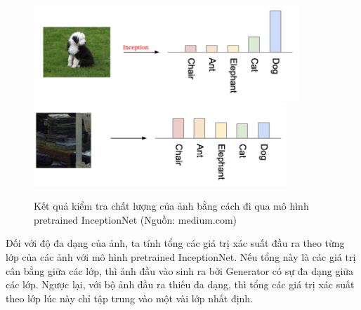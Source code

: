 {    \begin{figure}[H]
    \centering
    \includegraphics[width=10cm] {images/inception_1.png}
    \\[\smallskipamount]
    \includegraphics[width=9.5cm] {images/inception_2.png}
    \caption{Kết quả kiểm tra chất lượng của ảnh bằng cách đi qua mô hình pretrained InceptionNet (Nguồn: medium.com)}
    \label{fig:inception}
    \end{figure}
    
    \noindent Đối với độ đa dạng của ảnh, ta tính tổng các giá trị xác suất đầu ra theo từng lớp của các ảnh với mô hình pretrained InceptionNet. Nếu tổng này là các giá trị cân bằng giữa các lớp, thì ảnh đầu vào sinh ra bởi Generator có sự đa dạng giữa các lớp. Ngược lại, với bộ ảnh đầu ra thiếu đa dạng, thì tổng các giá trị xác suất theo lớp lúc này chỉ tập trung vào một vài lớp nhất định.
    
}
